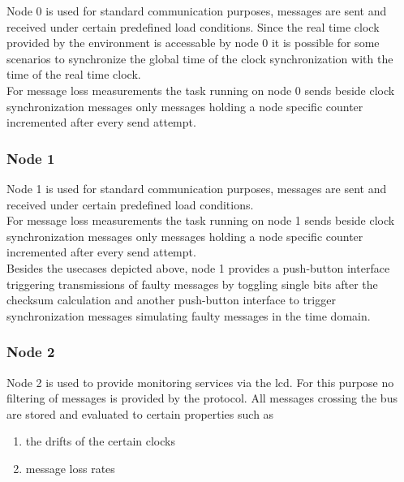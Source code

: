 Node 0 is used for standard communication purposes, messages are sent and received under certain predefined load conditions. Since the real time clock provided by the environment is
accessable by node 0 it is possible for some scenarios to synchronize the global time of the clock synchronization with the time of the real time clock.\\

For message loss measurements the task running on node 0 sends beside clock synchronization messages only messages holding a node specific counter incremented after every send attempt.\\ 

\subsubsection{Node 1}
\label{sec:app:specification:node1}

Node 1 is used for standard communication purposes, messages are sent and received under certain predefined load conditions.\\

For message loss measurements the task running on node 1 sends beside clock synchronization messages only messages holding 
a node specific counter incremented after every send attempt.\\ 

Besides the usecases depicted above, node 1 provides a push-button interface triggering transmissions of faulty messages 
by toggling single bits after the checksum calculation and another push-button interface to trigger synchronization messages 
simulating faulty messages in the time domain.\\

\subsubsection{Node 2}
\label{sec:app:specification:node2}

Node 2 is used to provide monitoring services via the lcd. For this purpose no filtering of messages is provided by the protocol.
All messages crossing the bus are stored and evaluated to certain properties such as

\begin{enumerate}
 \item the drifts of the certain clocks
 \item message loss rates
\end{enumerate}

